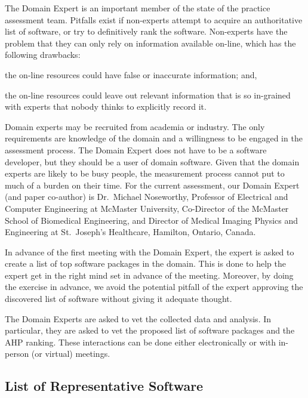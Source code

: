 \documentclass[final, 3p, times, authoryear]{elsarticle}
\begin{document}
The Domain Expert is an important member of the state of the practice assessment
team. Pitfalls exist if non-experts attempt to acquire an authoritative list of
software, or try to definitively rank the software. Non-experts have the problem
that they can only rely on information available on-line, which has the
following drawbacks:
\begin{inparaenum}[i)]
  \item the on-line resources could have false or inaccurate information; and,
  \item the on-line resources could leave out relevant information that is so
in-grained with experts that nobody thinks to explicitly record it.
\end{inparaenum}

Domain experts may be recruited from academia or industry.  The only
requirements are knowledge of the domain and a willingness to be engaged in the
assessment process.  The Domain Expert does not have to be a software developer,
but they should be a user of domain software.  Given that the domain experts are
likely to be busy people, the measurement process cannot put to much of a burden
on their time.  For the current assessment, our Domain Expert (and paper
co-author) is Dr.\ Michael Noseworthy, Professor of Electrical and Computer
Engineering at McMaster University, Co-Director of the McMaster School of
Biomedical Engineering, and Director of Medical Imaging Physics and Engineering
at St.\ Joseph's Healthcare, Hamilton, Ontario, Canada.  

In advance of the first meeting with the Domain Expert, the expert is asked to
create a list of top software packages in the domain.  This is done to help
the expert get in the right mind set in advance of the meeting.  Moreover,
by doing the exercise in advance, we avoid the potential pitfall of the expert
approving the discovered list of software without giving it adequate thought.

The Domain Experts are asked to vet the collected data and analysis.  In
particular, they are asked to vet the proposed list of software packages and the
AHP ranking.  These interactions can be done either electronically or with
in-person (or virtual) meetings.

\subsection{List of Representative Software} \label{sec_software_selection}
\end{document}
